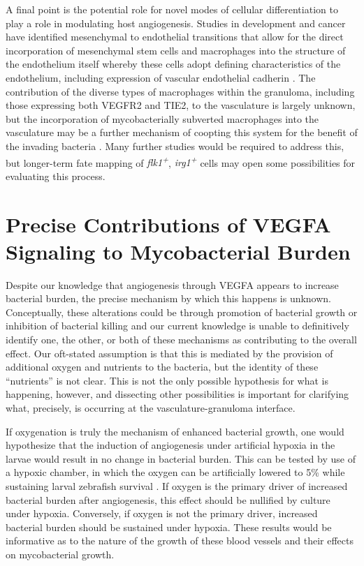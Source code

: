A final point is the potential role for novel modes of cellular differentiation to play a role in modulating host angiogenesis. Studies in development and cancer have identified mesenchymal to endothelial transitions that allow for the direct incorporation of mesenchymal stem cells and macrophages into the structure of the endothelium itself whereby these cells adopt defining characteristics of the endothelium, including expression of vascular endothelial cadherin \citep{Ubil2014, Wu2007, Zhang2008b}. The contribution of the diverse types of macrophages within the granuloma, including those expressing both VEGFR2 and TIE2, to the vasculature is largely unknown, but the incorporation of mycobacterially subverted macrophages into the vasculature may be a further mechanism of coopting this system for the benefit of the invading bacteria \citep{deCortie2014, Hall2012}. Many further studies would be required to address this, but longer\hyp{}term fate mapping of \textit{flk1\textsuperscript{+}}, \textit{irg1\textsuperscript{+}} cells may open some possibilities for evaluating this process.

\section{Precise Contributions of VEGFA Signaling to Mycobacterial Burden}

Despite our knowledge that angiogenesis through VEGFA appears to increase bacterial burden, the precise mechanism by which this happens is unknown. Conceptually, these alterations could be through promotion of bacterial growth or inhibition of bacterial killing and our current knowledge is unable to definitively identify one, the other, or both of these mechanisms as contributing to the overall effect. Our oft\hyp{}stated assumption is that this is mediated by the provision of additional oxygen and nutrients to the bacteria, but the identity of these ``nutrients'' is not clear. This is not the only possible hypothesis for what is happening, however, and dissecting other possibilities is important for clarifying what, precisely, is occurring at the vasculature\hyp{}granuloma interface. 

If oxygenation is truly the mechanism of enhanced bacterial growth, one would hypothesize that the induction of angiogenesis under artificial hypoxia in the larvae would result in no change in bacterial burden. This can be tested by use of a hypoxic chamber, in which the oxygen can be artificially lowered to 5\% while sustaining larval zebrafish survival \citep{Rombough2009, Long2015}. If oxygen is the primary driver of increased bacterial burden after angiogenesis, this effect should be nullified by culture under hypoxia. Conversely, if oxygen is not the primary driver, increased bacterial burden should be sustained under hypoxia. These results would be informative as to the nature of the growth of these blood vessels and their effects on mycobacterial growth.

